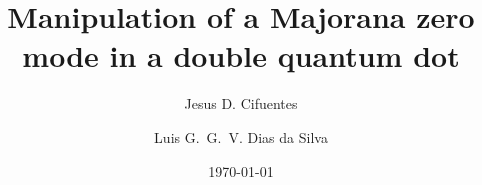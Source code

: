 \documentclass[showpacs,aps,prb,reprint,superscriptaddress]{revtex4-1}
\begin{document}
\newcommand{\be}   {\begin{equation}}
\newcommand{\ee}   {\end{equation}}
\newcommand{\ba}   {\begin{eqnarray}}
\newcommand{\ea}   {\end{eqnarray}}
\newcommand{\ve}  {\varepsilon}

\newcommand{\nhat}{\hat{n}}
\newcommand{\veck}{\textbf{k}}
\newcommand\ep{\epsilon}
\newcommand\g{\gamma}
\newcommand\s{\sigma}
\newcommand\up{\uparrow}
\newcommand\dw{\downarrow}
\newcommand\down{\downarrow}
\newcommand{\ed}[1]{\ep_{d#1}}
\newcommand{\ket}[1]{\vert #1 \rangle}
\newcommand{\ann}{a^{\dagger}}
\newcommand{\dann}{d^{\dagger}}
\newcommand{\tdots}{t_{dots}}
\newcommand{\gammaA}[1]{\gamma_{A,#1}}
\newcommand{\gammaB}[1]{\gamma_{B,#1}}
\newcommand{\Green}[1]{G_{#1}(\omega) }

\newcommand{\GreenG}[2]{G_{#1}^{ #2} (\omega) }

\newcommand{\super}{\vert \Delta \vert}





\title{ Manipulation of a Majorana zero mode in a  double quantum dot }

\author{Jesus D. Cifuentes}
\author{Luis G.~G.~V. Dias da Silva}

\date{ \today }
\end{document}
